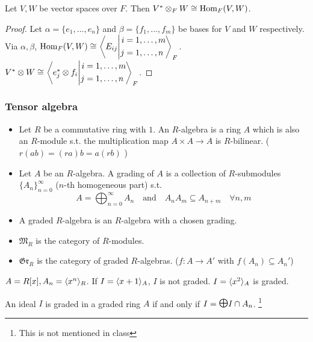 Let $V, W$ be vector spaces over $F$. Then
$V^* \otimes_F W \cong \Hom_F(V, W)$.
\begin{proof}
  Let $\alpha = \{e_1, \dots, e_n\}$ and $\beta = \{f_1,\dots, f_m\}$ be
  bases for $V$ and $W$ respectively.
  Via $\alpha, \beta$, $\Hom_F(V, W) \cong
  \gen*{E_{ij} \middle|
  \begin{aligned}i &= 1,\dots,m\\j &= 1,\dots,n\end{aligned}}_F$.
  $V^* \otimes W \cong
  \gen*{e_j^* \otimes f_i \middle|
  \begin{aligned}i &= 1,\dots,m\\j &= 1,\dots,n\end{aligned}}_F$.
\end{proof}

\subsubsection{Tensor algebra}
\begin{definition} \mbox{}
  \begin{itemize}
    \item Let $R$ be a commutative ring with $1$.
      An $R$-algebra is a ring $A$ which is also an $R$-module s.t. the
      multiplication map $A \times A \to A$ is $R$-bilinear.
      ( $r(ab) = (ra)b = a(rb)$ )
    \item Let $A$ be an $R$-algebra. A grading of $A$ is a collection of
      $R$-submodules $\{ A_n \}_{n=0}^\infty$ ($n$-th homogeneous part) s.t.
      \[
        A = \bigoplus_{n=0}^\infty A_n \quad \text{and} \quad
        A_nA_m \subseteq A_{n+m} \quad \forall n,m
      \]
    \item A graded $R$-algebra is an $R$-algebra with a chosen grading.
    \item $\mathfrak{M}_R$ is the category of $R$-modules.
    \item $\mathfrak{Gr}_R$ is the category of graded $R$-algebras.
      ($f: A \to A'$ with $f(A_n) \subseteq A_n'$)
  \end{itemize}
\end{definition}

\begin{example}
  $A = R[x], A_n = \gen{x^n}_R$. If $I = \gen{x+1}_A$, $I$ is not graded.
  $I = \gen{x^2}_A$ is graded.
\end{example}

\begin{definition}
  \color{red}
  An ideal $I$ is graded in a graded ring $A$ if and only if
  $I = \raisebox{0.3ex}{$\bigoplus$} I \cap A_n$.
  \footnote{This is not mentioned in class}
\end{definition}

